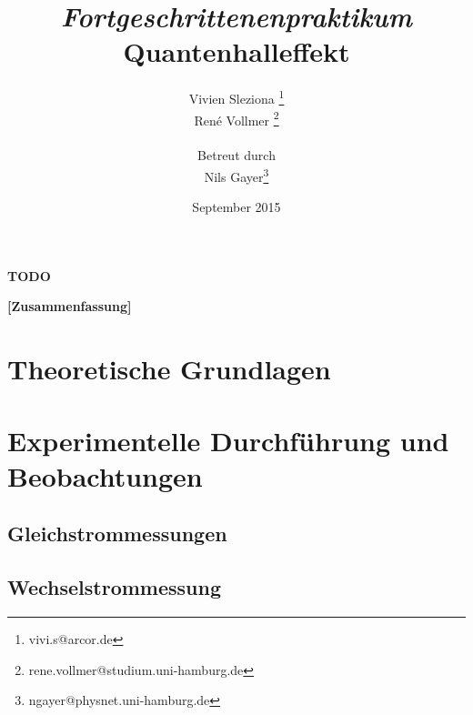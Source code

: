 \documentclass[12pt,a4paper]{article}
\begin{document}
	
	\textbf{TODO}
	
	
	
	\title{\textit{Fortgeschrittenenpraktikum}\\\textbf{Quantenhalleffekt} }
	\date{September 2015}
	\author{Vivien Sleziona \footnote{vivi.s@arcor.de}\\ René Vollmer \footnote{rene.vollmer@studium.uni-hamburg.de} \\ \\Betreut durch\\ Nils Gayer\footnote{ngayer@physnet.uni-hamburg.de}}
	
	\maketitle
	
	\begin{center} 
		\bigskip
		\bigskip
		
		\begin{minipage}{0.75\textwidth}
			\textbf{[Zusammenfassung]}
			
		\end{minipage}
	\end{center}
	
	\newpage
	
	\tableofcontents
	\vfill
	\newpage
	\clearpage	
	
	
	\section{Theoretische Grundlagen}
	

	
	\newpage
	\clearpage
	
	\section{Experimentelle Durchführung und Beobachtungen}
	
	
	\clearpage
	\subsection{Gleichstrommessungen}
	\label{ch:dc}
	
	\clearpage
	\subsection{Wechselstrommessung}
	\label{ch:ac}
	
	\clearpage
\end{document}
